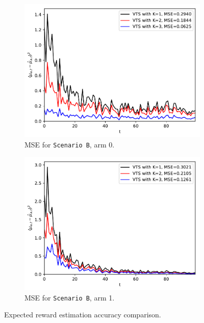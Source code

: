 \documentclass{article}
\begin{document}
\begin{figure}[!h]
	\begin{subfigure}[b]{0.48\textwidth}
		\includegraphics[width=\textwidth]{./figs/model_b_mse_arm_0.pdf}
		\caption{MSE for \texttt{Scenario B}, arm 0.}
		\label{fig:model_b_mse_arm_0}
	\end{subfigure}
	\begin{subfigure}[b]{0.48\textwidth}
		\includegraphics[width=\textwidth]{./figs/model_b_mse_arm_1.pdf}
		\caption{MSE for \texttt{Scenario B}, arm 1.}
		\label{fig:model_b_mse_arm_1}
	\end{subfigure}
	\caption{Expected reward estimation accuracy comparison.}
	\label{fig:mse_comparison}
\end{figure}
\end{document}
